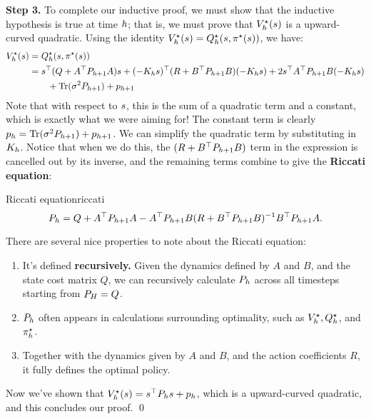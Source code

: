 \documentclass[\main/main]{subfiles}
\begin{document}
\textbf{Step 3.} To complete our inductive proof, we must show that the
inductive hypothesis is true at time $h$; that is, we must prove that
$V^\star_h(s)$ is a upward-curved quadratic.
Using the identity $V^\star_h(s) = Q^\star_h(s, \pi^\star(s))$, we have: \begin{align*}
    V^\star_h(s) & = Q^\star_h(s, \pi^\star(s))                                                                \\
                     & = s^\top (Q + A^\top P_{h+1} A) s + (-K_h s)^\top (R + B^\top P_{h+1} B) (-K_h s)
    + 2s^\top A^\top P_{h+1} B (-K_h s)                                                                          \\
                     & \qquad + \operatorname*{\textrm{Tr}}(\sigma^2 P_{h+1}) + p_{h+1}
\end{align*}
Note that with respect to $s$, this is the sum of a quadratic term and a constant,
which is exactly what we were aiming for!
The constant term is clearly $p_h = \operatorname*{\textrm{Tr}}(\sigma^2 P_{h+1}) + p_{h+1}$.
We can simplify the quadratic term by substituting in $K_h$.
Notice that when we do this, the $(R+B^\top P_{h+1} B)$ term in
the expression is cancelled out by its inverse, and the remaining terms combine to give the \textbf{Riccati equation}:

\begin{definition}{Riccati equation}{riccati}
    \[
        P_h = Q + A^\top P_{h+1} A - A^\top P_{h+1} B (R + B^\top P_{h+1} B)^{-1} B^\top P_{h+1} A.
    \]
\end{definition}

There are several nice properties to note about the Riccati equation:
\begin{enumerate}
    \item It's defined \textbf{recursively.} Given the dynamics defined by $A$ and $B$, and the state cost matrix $Q$, we can
          recursively calculate $P_h$ across all timesteps starting from $P_H = Q$.
    \item $P_h$ often appears in calculations surrounding optimality, such as $V^\star_h, Q^\star_h$, and $\pi^\star_h$.
    \item Together with the dynamics given by $A$ and $B$, and the action coefficients $R$, it fully defines the optimal policy.
\end{enumerate}

Now we've shown that $V^\star_h(s) = s^\top P_h s + p_h$, which is a upward-curved quadratic, and this concludes our proof. \qed
\end{document}
